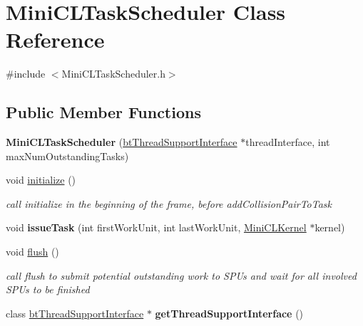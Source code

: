 \hypertarget{class_mini_c_l_task_scheduler}{\section{Mini\+C\+L\+Task\+Scheduler Class Reference}
\label{class_mini_c_l_task_scheduler}
}


{\ttfamily \#include $<$Mini\+C\+L\+Task\+Scheduler.\+h$>$}

\subsection*{Public Member Functions}
\begin{DoxyCompactItemize}
\item 
\hypertarget{class_mini_c_l_task_scheduler_a3fd2147fd33425ec936e49a898a4f6d0}{{\bfseries Mini\+C\+L\+Task\+Scheduler} (\hyperlink{classbt_thread_support_interface}{bt\+Thread\+Support\+Interface} $\ast$thread\+Interface, int max\+Num\+Outstanding\+Tasks)}\label{class_mini_c_l_task_scheduler_a3fd2147fd33425ec936e49a898a4f6d0}

\item 
\hypertarget{class_mini_c_l_task_scheduler_ae3dbcee1e36753aac47327d035560f10}{void \hyperlink{class_mini_c_l_task_scheduler_ae3dbcee1e36753aac47327d035560f10}{initialize} ()}\label{class_mini_c_l_task_scheduler_ae3dbcee1e36753aac47327d035560f10}

\begin{DoxyCompactList}\small\item\em call initialize in the beginning of the frame, before add\+Collision\+Pair\+To\+Task \end{DoxyCompactList}\item 
\hypertarget{class_mini_c_l_task_scheduler_accd5680fa809616919d83df8e959cb90}{void {\bfseries issue\+Task} (int first\+Work\+Unit, int last\+Work\+Unit, \hyperlink{struct_mini_c_l_kernel}{Mini\+C\+L\+Kernel} $\ast$kernel)}\label{class_mini_c_l_task_scheduler_accd5680fa809616919d83df8e959cb90}

\item 
\hypertarget{class_mini_c_l_task_scheduler_aaaaefcab8688c6c73792b9786f700873}{void \hyperlink{class_mini_c_l_task_scheduler_aaaaefcab8688c6c73792b9786f700873}{flush} ()}\label{class_mini_c_l_task_scheduler_aaaaefcab8688c6c73792b9786f700873}

\begin{DoxyCompactList}\small\item\em call flush to submit potential outstanding work to S\+P\+Us and wait for all involved S\+P\+Us to be finished \end{DoxyCompactList}\item 
\hypertarget{class_mini_c_l_task_scheduler_a9576eb22445a68bc9cf1ca0501b974f0}{class \hyperlink{classbt_thread_support_interface}{bt\+Thread\+Support\+Interface} $\ast$ {\bfseries get\+Thread\+Support\+Interface} ()}\label{class_mini_c_l_task_scheduler_a9576eb22445a68bc9cf1ca0501b974f0}


\end{DoxyCompactItemize}
